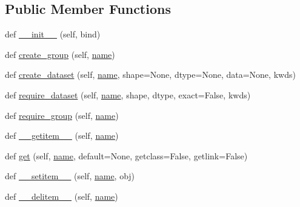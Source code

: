 \subsection*{Public Member Functions}
\begin{DoxyCompactItemize}
\item 
def \hyperlink{classh5py__LOCAL_1_1__hl_1_1group_1_1Group_a94e0a171d5c72220f94da45fd2954470}{\+\_\+\+\_\+init\+\_\+\+\_\+} (self, bind)
\item 
def \hyperlink{classh5py__LOCAL_1_1__hl_1_1group_1_1Group_a5470e2bfa711591b6b8c23423c62ef78}{create\+\_\+group} (self, \hyperlink{classh5py__LOCAL_1_1__hl_1_1base_1_1HLObject_a75703ed103699785a900c90c5a0d5044}{name})
\item 
def \hyperlink{classh5py__LOCAL_1_1__hl_1_1group_1_1Group_a6b006b0fe66c9e1748304929cd60bdd2}{create\+\_\+dataset} (self, \hyperlink{classh5py__LOCAL_1_1__hl_1_1base_1_1HLObject_a75703ed103699785a900c90c5a0d5044}{name}, shape=None, dtype=None, data=None, kwds)
\item 
def \hyperlink{classh5py__LOCAL_1_1__hl_1_1group_1_1Group_aaf02f11ac94a9ccd6aa1711b614e7e76}{require\+\_\+dataset} (self, \hyperlink{classh5py__LOCAL_1_1__hl_1_1base_1_1HLObject_a75703ed103699785a900c90c5a0d5044}{name}, shape, dtype, exact=False, kwds)
\item 
def \hyperlink{classh5py__LOCAL_1_1__hl_1_1group_1_1Group_ae317f8505e87034684c21714fe2d43c1}{require\+\_\+group} (self, \hyperlink{classh5py__LOCAL_1_1__hl_1_1base_1_1HLObject_a75703ed103699785a900c90c5a0d5044}{name})
\item 
def \hyperlink{classh5py__LOCAL_1_1__hl_1_1group_1_1Group_a73928239f90203efa936f23b37370985}{\+\_\+\+\_\+getitem\+\_\+\+\_\+} (self, \hyperlink{classh5py__LOCAL_1_1__hl_1_1base_1_1HLObject_a75703ed103699785a900c90c5a0d5044}{name})
\item 
def \hyperlink{classh5py__LOCAL_1_1__hl_1_1group_1_1Group_ab6d62403f8b24ea32e8f6c511d768f03}{get} (self, \hyperlink{classh5py__LOCAL_1_1__hl_1_1base_1_1HLObject_a75703ed103699785a900c90c5a0d5044}{name}, default=None, getclass=False, getlink=False)
\item 
def \hyperlink{classh5py__LOCAL_1_1__hl_1_1group_1_1Group_a155159fd40d0f5800b2fac78b0f6a4c1}{\+\_\+\+\_\+setitem\+\_\+\+\_\+} (self, \hyperlink{classh5py__LOCAL_1_1__hl_1_1base_1_1HLObject_a75703ed103699785a900c90c5a0d5044}{name}, obj)
\item 
def \hyperlink{classh5py__LOCAL_1_1__hl_1_1group_1_1Group_a1438f65d3fdb7cd05f70ddc06234af20}{\+\_\+\+\_\+delitem\+\_\+\+\_\+} (self, \hyperlink{classh5py__LOCAL_1_1__hl_1_1base_1_1HLObject_a75703ed103699785a900c90c5a0d5044}{name})

\end{DoxyCompactItemize}
